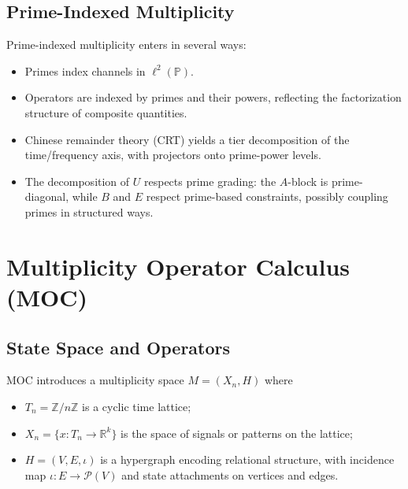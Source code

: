 \documentclass[11pt]{article}
\begin{document}
\subsection{Prime-Indexed Multiplicity}

Prime-indexed multiplicity enters in several ways:
\begin{itemize}[leftmargin=1.5em]
  \item Primes index channels in \(\ell^2(\mathbb{P})\).
  \item Operators are indexed by primes and their powers, reflecting the
  factorization structure of composite quantities.
  \item Chinese remainder theory (CRT) yields a tier decomposition of the
  time/frequency axis, with projectors onto prime-power levels.
  \item The decomposition of \(U\) respects prime grading: the \(A\)-block is
  prime-diagonal, while \(B\) and \(E\) respect prime-based constraints,
  possibly coupling primes in structured ways.
\end{itemize}

\section{Multiplicity Operator Calculus (MOC)}

\subsection{State Space and Operators}

MOC introduces a multiplicity space \(M = (X_n,H)\) where \cite{MOC}
\begin{itemize}[leftmargin=1.5em]
  \item \(T_n=\mathbb{Z}/n\mathbb{Z}\) is a cyclic time lattice;
  \item \(X_n = \{x:T_n \to \mathbb{R}^k\}\) is the space of signals or
  patterns on the lattice;
  \item \(H=(V,E,\iota)\) is a hypergraph encoding relational structure, with
  incidence map \(\iota:E\to\mathcal{P}(V)\) and state attachments on vertices
  and edges.
\end{itemize}
\end{document}
